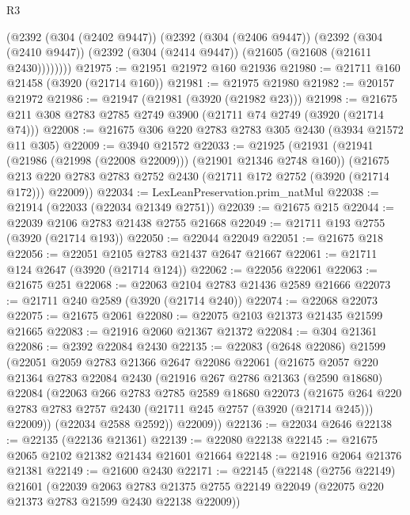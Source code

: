 \begin{lexlean}{R3}
\begin{coremodule}
      (@2392
        (@304 (@2402 @9447))
        (@2392
          (@304 (@2406 @9447))
          (@2392
            (@304 (@2410 @9447))
            (@2392 (@304 (@2414 @9447)) (@21605 (@21608 (@21611 @2430))))))))
@21975 := @21951 @21972 @160 @21936
@21980 := @21711 @160 @21458 (@3920 (@21714 @160))
@21981 := @21975 @21980
@21982 := @20157 @21972
@21986 := @21947 (@21981 (@3920 (@21982 @23)))
@21998 := @21675 @211 @308 @2783 @2785 @2749 @3900 (@21711 @74 @2749 (@3920 (@21714 @74)))
@22008 := @21675 @306 @220 @2783 @2783 @305 @2430 (@3934 @21572 @11 @305)
@22009 := @3940 @21572
@22033 := @21925
    (@21931
      (@21941 (@21986 (@21998 (@22008 @22009))) (@21901 @21346 @2748 @160))
      (@21675 @213 @220 @2783 @2783 @2752 @2430 (@21711 @172 @2752 (@3920 (@21714 @172))) @22009))
@22034 := LexLeanPreservation.prim_natMul
@22038 := @21914 (@22033 (@22034 @21349 @2751))
@22039 := @21675 @215
@22044 := @22039 @2106 @2783 @21438 @2755 @21668
@22049 := @21711 @193 @2755 (@3920 (@21714 @193))
@22050 := @22044 @22049
@22051 := @21675 @218
@22056 := @22051 @2105 @2783 @21437 @2647 @21667
@22061 := @21711 @124 @2647 (@3920 (@21714 @124))
@22062 := @22056 @22061
@22063 := @21675 @251
@22068 := @22063 @2104 @2783 @21436 @2589 @21666
@22073 := @21711 @240 @2589 (@3920 (@21714 @240))
@22074 := @22068 @22073
@22075 := @21675 @2061
@22080 := @22075 @2103 @21373 @21435 @21599 @21665
@22083 := @21916 @2060 @21367 @21372
@22084 := @304 @21361
@22086 := @2392 @22084 @2430
@22135 := @22083
    (@2648 @22086)
    @21599
    (@22051
      @2059
      @2783
      @21366
      @2647
      @22086
      @22061
      (@21675
        @2057
        @220
        @21364
        @2783
        @22084
        @2430
        (@21916
          @267
          @2786
          @21363
          (@2590 @18680)
          @22084
          (@22063
            @266
            @2783
            @2785
            @2589
            @18680
            @22073
            (@21675
              @264
              @220
              @2783
              @2783
              @2757
              @2430
              (@21711 @245 @2757 (@3920 (@21714 @245)))
              @22009))
          (@22034 @2588 @2592))
        @22009))
@22136 := @22034 @2646
@22138 := @22135 (@22136 @21361)
@22139 := @22080 @22138
@22145 := @21675 @2065 @2102 @21382 @21434 @21601 @21664
@22148 := @21916 @2064 @21376 @21381
@22149 := @21600 @2430
@22171 := @22145
    (@22148
      (@2756 @22149)
      @21601
      (@22039
        @2063
        @2783
        @21375
        @2755
        @22149
        @22049
        (@22075 @220 @21373 @2783 @21599 @2430 @22138 @22009))

\end{coremodule}
\end{lexlean}
